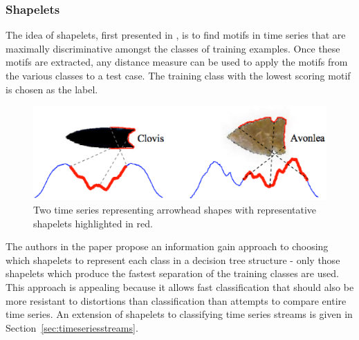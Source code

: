 	\subsubsection{Shapelets}
	The idea of shapelets, first presented in \citep{ye2009time}, is to find motifs in time series that are maximally discriminative amongst the classes of training examples. Once these motifs are extracted, any distance measure can be used to apply the motifs from the various classes to a test case. The training class with the lowest scoring motif is chosen as the label.
	\begin{figure}[ht!]
	\centering
	\includegraphics[width=120mm]{images/shapelet.eps}
	\caption{Two time series representing arrowhead shapes with representative shapelets highlighted in red.}
	\label{fig:shapelets}
	\end{figure}
	The authors in the paper propose an information gain approach to choosing which shapelets to represent each class in a decision tree structure - only those shapelets which produce the fastest separation of the training classes are used. This approach is appealing because it allows fast classification that should also be more resistant to distortions than classification than attempts to compare entire time series. An extension of shapelets to classifying time series streams is given in Section~\ref{sec:timeseriesstreams}.


